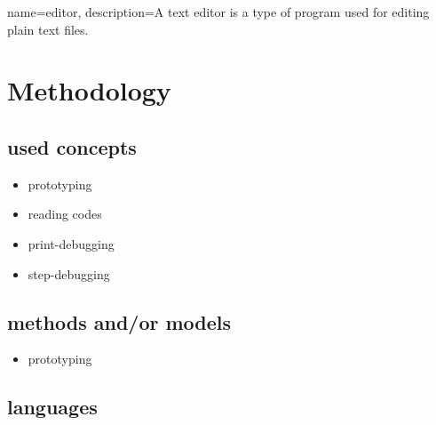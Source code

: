 %
%
%
%



{
  name={editor},
  description={A text editor is a type of program used for editing plain text files.}
}

\chapter{Methodology}

\section{used concepts}

\begin{itemize}
\item prototyping
\item reading codes
\item print-debugging
\item step-debugging
\end{itemize}

\section{methods and/or models}

\begin{itemize}
\item prototyping
\end{itemize}

\section{languages}

